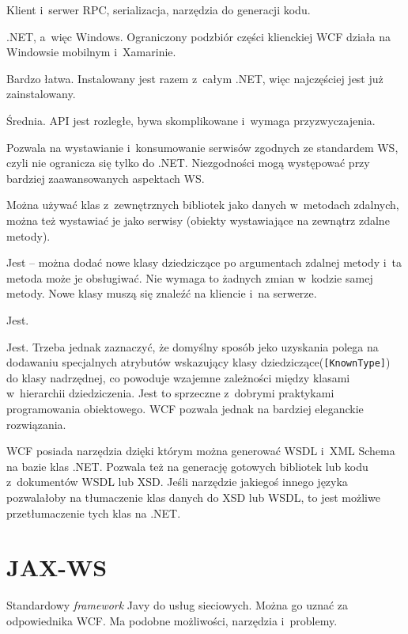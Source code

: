 \begin{description}
Klient i~serwer RPC, serializacja, narzędzia do generacji kodu.

.NET, a~więc Windows. Ograniczony podzbiór części klienckiej WCF działa na Windowsie mobilnym i~Xamarinie.

Bardzo łatwa. Instalowany jest razem z~całym .NET, więc najczęściej jest już zainstalowany.

Średnia. API jest rozległe, bywa skomplikowane i~wymaga przyzwyczajenia.

Pozwala na wystawianie i~konsumowanie serwisów zgodnych ze standardem WS, czyli nie ogranicza się tylko do .NET.
Niezgodności mogą występować przy bardziej zaawansowanych aspektach WS.

Można używać klas z~zewnętrznych bibliotek jako danych w~metodach zdalnych, można też wystawiać je jako serwisy (obiekty wystawiające na zewnątrz zdalne metody).

Jest -- można dodać nowe klasy dziedziczące po argumentach zdalnej metody i~ta metoda może je obsługiwać. Nie wymaga to żadnych zmian w~kodzie samej metody. Nowe klasy muszą się znaleźć na kliencie i~na serwerze.

Jest.

Jest.
Trzeba jednak zaznaczyć, że domyślny sposób jeko uzyskania polega na dodawaniu specjalnych atrybutów wskazujący klasy dziedziczące(\texttt{[KnownType]}) do klasy nadrzędnej, co powoduje wzajemne zależności między klasami w~hierarchii dziedziczenia. Jest to sprzeczne z~dobrymi praktykami programowania obiektowego.
WCF pozwala jednak na bardziej eleganckie rozwiązania.

WCF posiada narzędzia dzięki którym można generować WSDL i~XML Schema na bazie klas .NET.
Pozwala też na generację gotowych bibliotek lub kodu z~dokumentów WSDL lub XSD.
Jeśli narzędzie jakiegoś innego języka pozwalałoby na tłumaczenie klas danych do XSD lub WSDL, to jest możliwe przetłumaczenie tych klas na .NET.
\end{description}



\section{JAX-WS}
Standardowy \emph{framework} Javy do usług sieciowych. Można go uznać za odpowiednika WCF. Ma podobne możliwości, narzędzia i~problemy.

